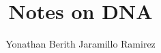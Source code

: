 \documentclass[12pt,letterpaper]{article}
\author{Yonathan Berith Jaramillo Ramirez}
\begin{document}
\title{Notes on DNA}
\maketitle


\end{document}
